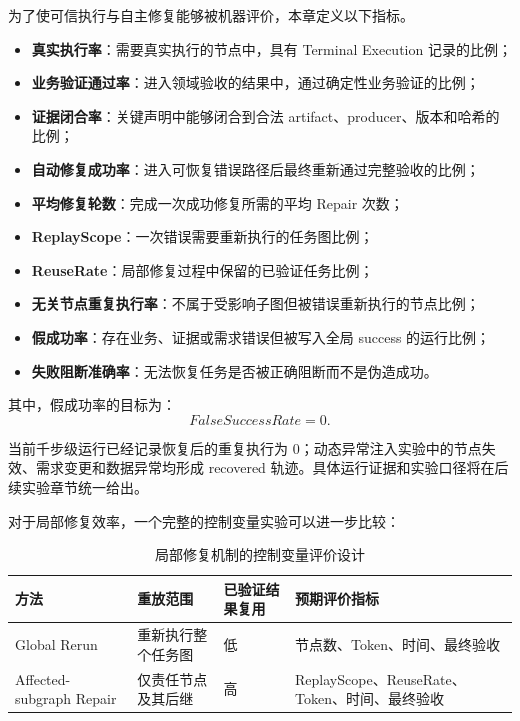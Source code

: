 \documentclass[UTF8,a4paper,12pt,oneside]{ctexbook}
\begin{document}
为了使可信执行与自主修复能够被机器评价，本章定义以下指标。

\begin{itemize}
    \item \textbf{真实执行率}：需要真实执行的节点中，具有 Terminal Execution 记录的比例；
    \item \textbf{业务验证通过率}：进入领域验收的结果中，通过确定性业务验证的比例；
    \item \textbf{证据闭合率}：关键声明中能够闭合到合法 artifact、producer、版本和哈希的比例；
    \item \textbf{自动修复成功率}：进入可恢复错误路径后最终重新通过完整验收的比例；
    \item \textbf{平均修复轮数}：完成一次成功修复所需的平均 Repair 次数；
    \item \textbf{ReplayScope}：一次错误需要重新执行的任务图比例；
    \item \textbf{ReuseRate}：局部修复过程中保留的已验证任务比例；
    \item \textbf{无关节点重复执行率}：不属于受影响子图但被错误重新执行的节点比例；
    \item \textbf{假成功率}：存在业务、证据或需求错误但被写入全局 success 的运行比例；
    \item \textbf{失败阻断准确率}：无法恢复任务是否被正确阻断而不是伪造成功。
\end{itemize}

其中，假成功率的目标为：
\[
FalseSuccessRate=0.
\]

当前千步级运行已经记录恢复后的重复执行为 0；动态异常注入实验中的节点失效、需求变更和数据异常均形成 recovered 轨迹。具体运行证据和实验口径将在后续实验章节统一给出。

对于局部修复效率，一个完整的控制变量实验可以进一步比较：

\begin{table}[htbp]
\centering
\caption{局部修复机制的控制变量评价设计}
\label{tab:repair-ablation-design}
\begin{tabularx}{0.96\textwidth}{p{}X X X}
\toprule
方法 & 重放范围 & 已验证结果复用 & 预期评价指标\\
\midrule

Global Rerun
&
重新执行整个任务图
&
低
&
节点数、Token、时间、最终验收\\

Affected-subgraph Repair
&
仅责任节点及其后继
&
高
&
ReplayScope、ReuseRate、Token、时间、最终验收\\

\bottomrule
\end{tabularx}
\end{table}
\end{document}
